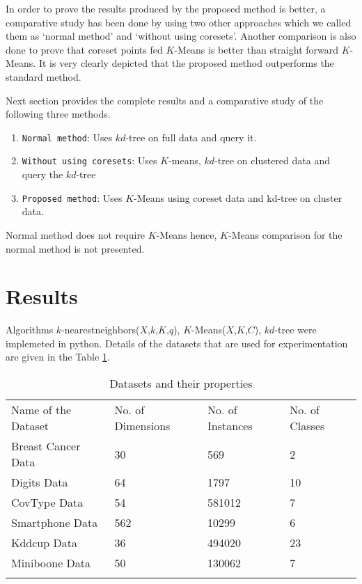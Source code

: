 \documentclass[runningheads]{llncs}
\begin{document}
In order to prove the results produced by the proposed method is better, a comparative study has been done by using two other approaches which we called them as `normal method' and ‘without using coresets'. Another comparison is also done to prove that coreset points fed $K$-Means is better than straight forward $K$-Means. It is very clearly depicted that the proposed method outperforms the standard method. 

Next section provides the complete results and a comparative study of the following three methods.

\begin{enumerate}
	\item{\texttt{Normal method}: Uses $kd$-tree on full data and query it.}
	\item{\texttt{Without using coresets}: Uses $K$-means, $kd$-tree on clustered data and query the $kd$-tree}
	\item{\texttt{Proposed method}: Uses $K$-Means using coreset data and kd-tree on cluster data.}
\end{enumerate}

Normal method does not require $K$-Means hence, $K$-Means comparison for the normal method is not presented.



\section{Results}
\label{sec:4}

Algorithms $k$-nearestneighbors($X$,$k$,$K$,$q$), $K$-Means($X$,$K$,$C$), $kd$-tree\cite{Spatial KDTree} were implemeted in python. Details of the datasets\cite{Dataset} that are used for experimentation are given in the Table \ref{tab:4}. 
\smallskip
\begin{table}[!hbt]
	\caption{Datasets and their properties}
	\label{tab:4}       %
	\begin{tabular}{p{4cm}p{2.4cm}p{2cm}p{2cm}}
		\hline\noalign{\smallskip}
		Name of the Dataset & No. of Dimensions & No. of Instances & No. of Classes  \\
		\noalign{\smallskip}\hline\noalign{\smallskip}
		Breast Cancer Data & 30  & 569 & 2\\
		Digits Data & 64 & 1797 & 10\\
		CovType Data & 54  & 581012 & 7\\
		Smartphone Data & 562  & 10299 & 6 \\
		Kddcup Data & 36  & 494020 & 23 \\
		Miniboone Data & 50  & 130062 & 7 \\
		\noalign{\smallskip}\hline\noalign{\smallskip}
	\end{tabular}
\end{table}
\end{document}
